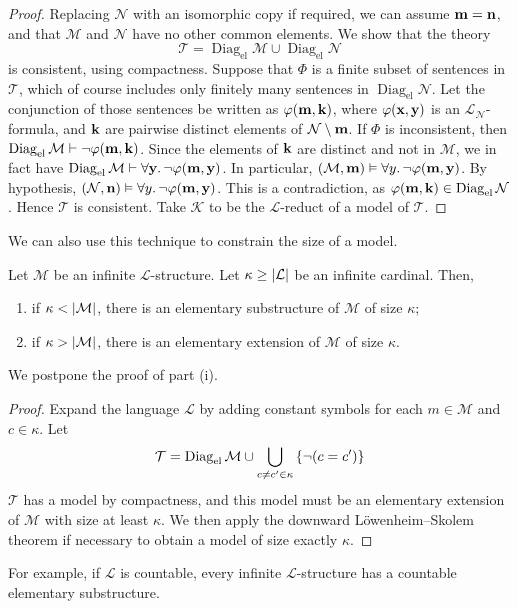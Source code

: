 \begin{proof}
    Replacing \( \mathcal N \) with an isomorphic copy if required, we can assume \( \vb m = \vb n \), and that \( \mathcal M \) and \( \mathcal N \) have no other common elements.
    We show that the theory
    \[ \mathcal T = \operatorname{Diag}_{\text{el}} \mathcal M \cup \operatorname{Diag}_{\text{el}} \mathcal N \]
    is consistent, using compactness.
    Suppose that \( \Phi \) is a finite subset of sentences in \( \mathcal T \), which of course includes only finitely many sentences in \( \operatorname{Diag}_{\text{el}} \mathcal N \).
    Let the conjunction of those sentences be written as \( \varphi(\vb m, \vb k) \), where \( \varphi(\vb x, \vb y) \) is an \( \mathcal L_{\mathcal N} \)-formula, and \( \vb k \) are pairwise distinct elements of \( \mathcal N \setminus \vb m \).
    If \( \Phi \) is inconsistent, then \( \operatorname{Diag}_{\text{el}} \mathcal M \vdash \neg \varphi(\vb m, \vb k) \).
    Since the elements of \( \vb k \) are distinct and not in \( \mathcal M \), we in fact have \( \operatorname{Diag}_{\text{el}} \mathcal M \vdash \forall \vb y.\, \neg \varphi(\vb m, \vb y) \).
    In particular, \( (\mathcal M, \vb m) \vDash \forall y.\, \neg \varphi(\vb m, \vb y) \).
    By hypothesis, \( (\mathcal N, \vb n) \vDash \forall y.\, \neg \varphi(\vb m, \vb y) \).
    This is a contradiction, as \( \varphi(\vb m, \vb k) \in \operatorname{Diag}_{\text{el}} \mathcal N \).
    Hence \( \mathcal T \) is consistent.
    Take \( \mathcal K \) to be the \( \mathcal L \)-reduct of a model of \( \mathcal T \).
\end{proof}
We can also use this technique to constrain the size of a model.
\begin{theorem}
    Let \( \mathcal M \) be an infinite \( \mathcal L \)-structure.
    Let \( \kappa \geq \abs{\mathcal L} \) be an infinite cardinal.
    Then,
    \begin{enumerate}
        \item if \( \kappa < \abs{\mathcal M} \), there is an elementary substructure of \( \mathcal M \) of size \( \kappa \);
        \item if \( \kappa > \abs{\mathcal M} \), there is an elementary extension of \( \mathcal M \) of size \( \kappa \).
    \end{enumerate}
\end{theorem}
We postpone the proof of part (i).
\begin{proof}
    Expand the language \( \mathcal L \) by adding constant symbols for each \( m \in \mathcal M \) and \( c \in \kappa \).
    Let
    \[ \mathcal T = \operatorname{Diag}_{\text{el}} \mathcal M \cup \bigcup_{c \neq c' \in \kappa} \qty{\neg(c = c')} \]
    \( \mathcal T \) has a model by compactness, and this model must be an elementary extension of \( \mathcal M \) with size at least \( \kappa \).
    We then apply the downward L\"owenheim--Skolem theorem if necessary to obtain a model of size exactly \( \kappa \).
\end{proof}
For example, if \( \mathcal L \) is countable, every infinite \( \mathcal L \)-structure has a countable elementary substructure.
